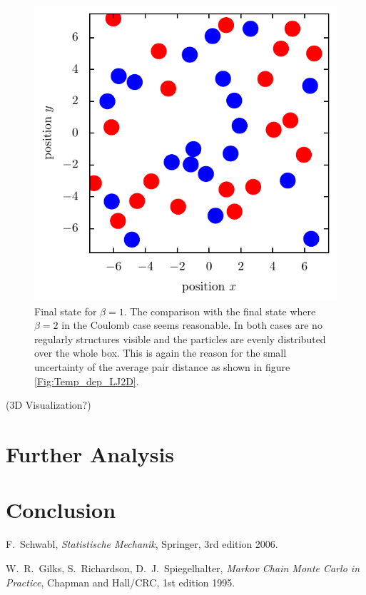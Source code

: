 \documentclass[11pt, a4paper]{article}
\numberwithin{equation}{section}
\newcommand{\remark}[1]{{\color{red}(#1)}}
\begin{document}
\begin{figure}[!h]
\centering
\includegraphics[scale=1]{figures/Beta_1_LJ.pdf}
\caption{Final state for $\beta = 1$.
The comparison with the final state where $\beta = 2$ in the Coulomb case seems reasonable.
In both cases are no regularly structures visible and the particles are evenly distributed over the whole box.
This is again the reason for the small uncertainty of the average pair distance as shown in figure \ref{Fig:Temp_dep_LJ2D}.}
\end{figure}
\remark{3D Visualization?}
\section{Further Analysis} \label{sec:Further_Analysis}


\section{Conclusion}



\FloatBarrier
\vspace{\fill}
\begin{thebibliography}{9}
	F.\ Schwabl,
	\emph{Statistische Mechanik},
	Springer, 3rd edition 2006.

	W.\ R.\ Gilks, S.\ Richardson, D.\ J.\ Spiegelhalter,
	\emph{Markov Chain Monte Carlo in Practice},
	Chapman and Hall/CRC, 1st edition 1995.
\end{thebibliography}
\end{document}
